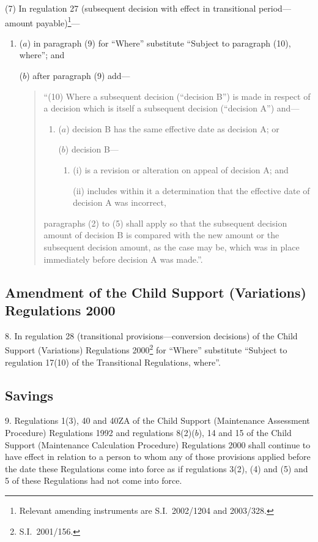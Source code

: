\documentclass[12pt,a4paper]{article}
\begin{document}
(7) In regulation 27 (subsequent decision with effect in transitional period—amount payable)\footnote{Relevant amending instruments are S.I.\ 2002/1204 and 2003/328.}—
\begin{enumerate}\item[]
($a$) in paragraph (9) for “Where” substitute “Subject to paragraph (10), where”; and

($b$) after paragraph (9) add—
\begin{quotation}
“(10) Where a subsequent decision (“decision B”) is made in respect of a decision which is itself a subsequent decision (“decision A”) and—
\begin{enumerate}\item[]
($a$) decision B has the same effective date as decision A; or

($b$) decision B—
\begin{enumerate}\item[]
(i) is a revision or alteration on appeal of decision A; and

(ii) includes within it a determination that the effective date of decision A was incorrect,
\end{enumerate}
\end{enumerate}
paragraphs (2) to (5) shall apply so that the subsequent decision amount of decision B is compared with the new amount or the subsequent decision amount, as the case may be, which was in place immediately before decision A was made.”.
\end{quotation}
\end{enumerate}

\subsection[8. Amendment of the Child Support (Variations) Regulations 2000]{Amendment of the Child Support (Variations) Regulations 2000}

8.  In regulation 28 (transitional provisions—conversion decisions) of the Child Support (Variations) Regulations 2000\footnote{S.I.\ 2001/156.} for “Where” substitute “Subject to regulation 17(10) of the Transitional Regulations, where”.

\subsection[9. Savings]{Savings}

9.  Regulations 1(3), 40 and 40ZA of the Child Support (Maintenance Assessment Procedure) Regulations 1992 and regulations 8(2)($b$), 14 and 15 of the Child Support (Maintenance Calculation Procedure) Regulations 2000 shall continue to have effect in relation to a person to whom any of those provisions applied before the date these Regulations come into force as if regulations 3(2), (4) and (5) and 5 of these Regulations had not come into force. 
\end{document}
